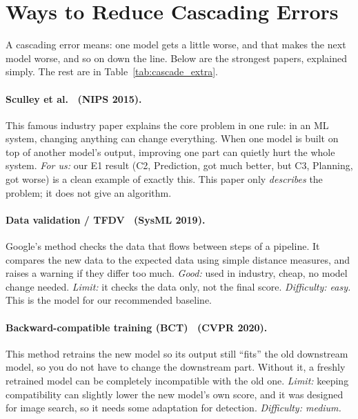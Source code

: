 \documentclass[11pt,a4paper]{article}
\begin{document}
\section{Ways to Reduce Cascading Errors}

A cascading error means: one model gets a little worse, and that makes
the next model worse, and so on down the line. Below are the strongest
papers, explained simply. The rest are in Table~\ref{tab:cascade_extra}.

\paragraph{Sculley et al.~\cite{sculley2015hidden} (NIPS 2015).}
This famous industry paper explains the core problem in one rule: in an
ML system, changing anything can change everything. When one model is
built on top of another model's output, improving one part can quietly
hurt the whole system. \emph{For us:} our E1 result (C2, Prediction, got
much better, but C3, Planning, got worse) is a clean example of exactly
this. This paper only \emph{describes} the problem; it does not give an
algorithm.

\paragraph{Data validation / TFDV~\cite{breck2019data} (SysML 2019).}
Google's method checks the data that flows between steps of a pipeline.
It compares the new data to the expected data using simple distance
measures, and raises a warning if they differ too much. \emph{Good:} used
in industry, cheap, no model change needed. \emph{Limit:} it checks the
data only, not the final score. \emph{Difficulty: easy.} This is the
model for our recommended baseline.

\paragraph{Backward-compatible training (BCT)~\cite{shen2020bct} (CVPR 2020).}
This method retrains the new model so its output still ``fits'' the old
downstream model, so you do not have to change the downstream part.
Without it, a freshly retrained model can be completely incompatible with
the old one. \emph{Limit:} keeping compatibility can slightly lower the
new model's own score, and it was designed for image search, so it needs
some adaptation for detection. \emph{Difficulty: medium.}
\end{document}
